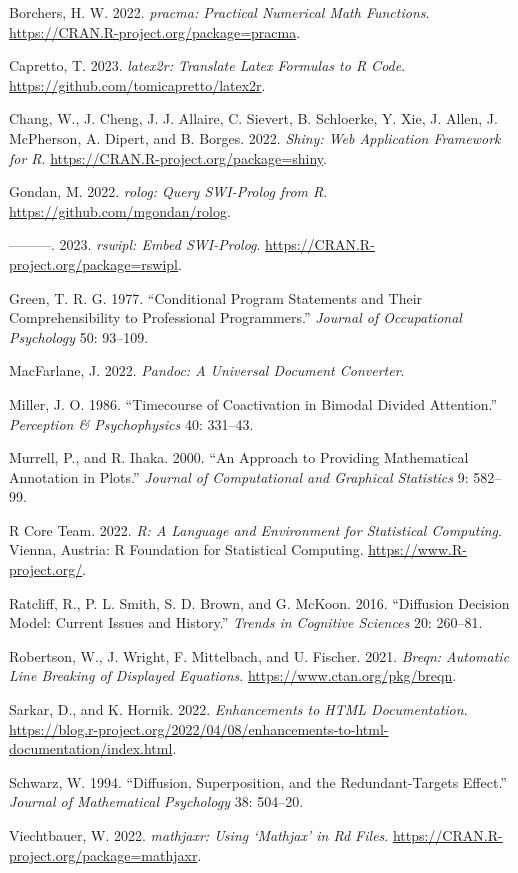 Borchers, H. W. 2022. \emph{pracma: Practical Numerical Math Functions}.
\url{https://CRAN.R-project.org/package=pracma}.

Capretto, T. 2023. \emph{latex2r: Translate Latex Formulas to R Code}.
\url{https://github.com/tomicapretto/latex2r}.

Chang, W., J. Cheng, J. J. Allaire, C. Sievert, B. Schloerke, Y. Xie, J.
Allen, J. McPherson, A. Dipert, and B. Borges. 2022. \emph{Shiny: Web
Application Framework for R}.
\url{https://CRAN.R-project.org/package=shiny}.

Gondan, M. 2022. \emph{rolog: Query SWI-Prolog from R}.
\url{https://github.com/mgondan/rolog}.

---------. 2023. \emph{rswipl: Embed SWI-Prolog}.
\url{https://CRAN.R-project.org/package=rswipl}.

Green, T. R. G. 1977. ``Conditional Program Statements and Their
Comprehensibility to Professional Programmers.'' \emph{Journal of Occupational
Psychology} 50: 93--109.

MacFarlane, J. 2022. \emph{Pandoc: A Universal Document Converter}.

Miller, J. O. 1986. ``Timecourse of Coactivation in Bimodal Divided
Attention.'' \emph{Perception \& Psychophysics} 40: 331--43.

Murrell, P., and R. Ihaka. 2000. ``An Approach to Providing Mathematical
Annotation in Plots.'' \emph{Journal of Computational and Graphical
Statistics} 9: 582--99.

R Core Team. 2022. \emph{R: A Language and Environment for Statistical
Computing}. Vienna, Austria: R Foundation for Statistical Computing.
\url{https://www.R-project.org/}.

Ratcliff, R., P. L. Smith, S. D. Brown, and G. McKoon. 2016. ``Diffusion
Decision Model: Current Issues and History.'' \emph{Trends in Cognitive
Sciences} 20: 260--81.

Robertson, W., J. Wright, F. Mittelbach, and U. Fischer. 2021. \emph{Breqn:
Automatic Line Breaking of Displayed Equations}.
\url{https://www.ctan.org/pkg/breqn}.

Sarkar, D., and K. Hornik. 2022. \emph{Enhancements to HTML Documentation}.
\url{https://blog.r-project.org/2022/04/08/enhancements-to-html-documentation/index.html}.

Schwarz, W. 1994. ``Diffusion, Superposition, and the Redundant-Targets
Effect.'' \emph{Journal of Mathematical Psychology} 38: 504--20.

Viechtbauer, W. 2022. \emph{mathjaxr: Using `Mathjax' in Rd Files}.
\url{https://CRAN.R-project.org/package=mathjaxr}.

